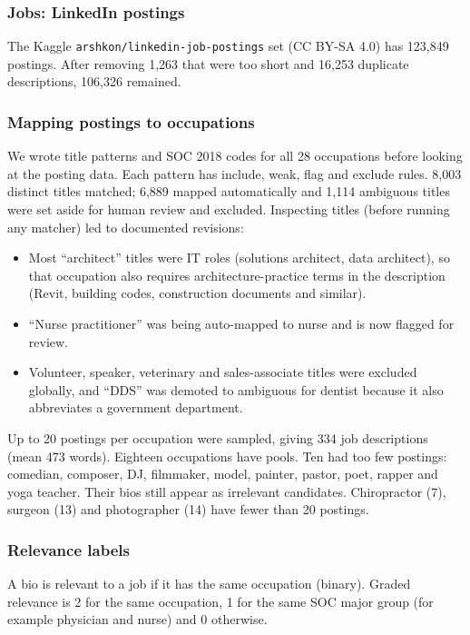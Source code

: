 \documentclass[conference,a4paper]{IEEEtran}
\begin{document}
\subsubsection{Jobs: LinkedIn postings} The Kaggle \texttt{arshkon/\allowbreak{}linkedin-\allowbreak{}job-\allowbreak{}postings} set (CC BY-SA 4.0) has 123,849 postings. After removing 1,263 that were too short and 16,253 duplicate descriptions, 106,326 remained.

\subsubsection{Mapping postings to occupations} We wrote title patterns and SOC 2018 codes for all 28 occupations before looking at the posting data. Each pattern has include, weak, flag and exclude rules. 8,003 distinct titles matched; 6,889 mapped automatically and 1,114 ambiguous titles were set aside for human review and excluded. Inspecting titles (before running any matcher) led to documented revisions:

\begin{itemize}
\item Most ``architect'' titles were IT roles (solutions architect, data architect), so that occupation also requires architecture-practice terms in the description (Revit, building codes, construction documents and similar).
\item ``Nurse practitioner'' was being auto-mapped to nurse and is now flagged for review.
\item Volunteer, speaker, veterinary and sales-associate titles were excluded globally, and ``DDS'' was demoted to ambiguous for dentist because it also abbreviates a government department.
\end{itemize}
Up to 20 postings per occupation were sampled, giving 334 job descriptions (mean 473 words). Eighteen occupations have pools. Ten had too few postings: comedian, composer, DJ, filmmaker, model, painter, pastor, poet, rapper and yoga teacher. Their bios still appear as irrelevant candidates. Chiropractor (7), surgeon (13) and photographer (14) have fewer than 20 postings.

\subsubsection{Relevance labels} A bio is relevant to a job if it has the same occupation (binary). Graded relevance is 2 for the same occupation, 1 for the same SOC major group (for example physician and nurse) and 0 otherwise.
\end{document}
